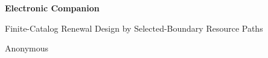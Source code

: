 \documentclass[11pt,letterpaper]{article}
\theoremstyle{definition}\newtheorem{remark}[theorem]{Remark}
\begin{document}
\begin{center}{\Large\bfseries Electronic Companion}\par\vspace{6pt}
Finite-Catalog Renewal Design by Selected-Boundary Resource Paths\par Anonymous\end{center}


\clearpage
\clearpage
\clearpage
\end{document}

